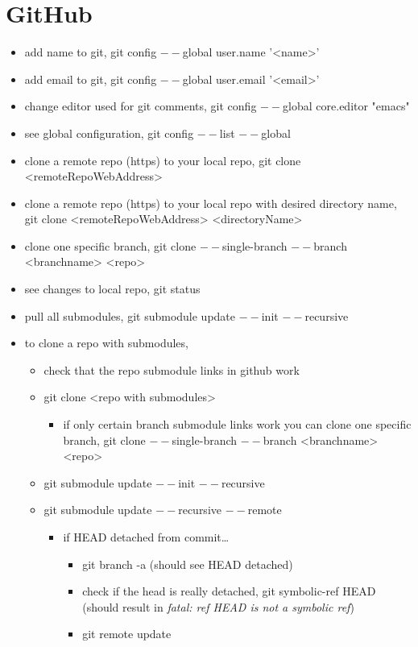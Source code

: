 \documentclass[11pt]{article}
\begin{document}
\section{GitHub}
\label{sec:orgf41bc13}
\begin{itemize}
\item add name to git, git config \(--\)global user.name '<name>'
\item add email to git, git config \(--\)global user.email '<email>'
\item change editor used for git comments, git config \(--\)global core.editor "emacs"
\item see global configuration, git config \(--\)list \(--\)global
\item clone a remote repo (https) to your local repo, git clone <remoteRepoWebAddress>
\item clone a remote repo (https) to your local repo with desired directory name, git clone <remoteRepoWebAddress> <directoryName>
\item clone one specific branch, git clone \(--\)single-branch \(--\)branch <branchname> <repo>
\item see changes to local repo, git status
\item pull all submodules, git submodule update \(--\)init \(--\)recursive
\item to clone a repo with submodules,
\begin{itemize}
\item check that the repo submodule links in github work
\item git clone <repo with submodules>
\begin{itemize}
\item if only certain branch submodule links work you can clone one specific branch, git clone \(--\)single-branch \(--\)branch <branchname> <repo>
\end{itemize}
\item git submodule update \(--\)init \(--\)recursive
\item git submodule update \(--\)recursive \(--\)remote
\begin{itemize}
\item if HEAD detached from commit\ldots{}
\begin{itemize}
\item git branch -a (should see HEAD detached)
\item check if the head is really detached, git symbolic-ref HEAD (should result in \emph{fatal: ref HEAD is not a symbolic ref})
\item git remote update

\end{itemize}
\end{itemize}
\end{itemize}
\end{itemize}
\end{document}
